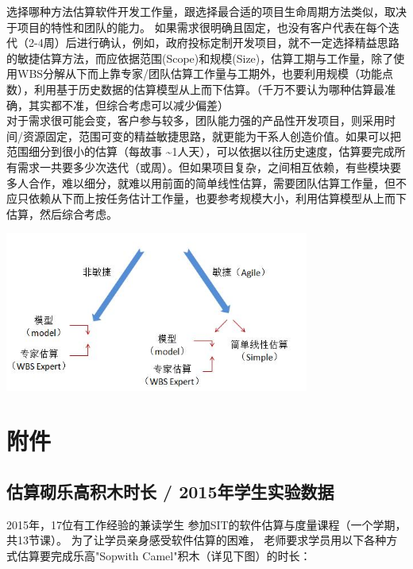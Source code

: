 选择哪种方法估算软件开发工作量，跟选择最合适的项目生命周期方法类似，取决于项目的特性和团队的能力。
如果需求很明确且固定，也没有客户代表在每个迭代（2-4周）后进行确认，例如，政府投标定制开发项目，就不一定选择精益思路的敏捷估算方法，而应依据范围(Scope)和规模(Size)，估算工期与工作量，除了使用WBS分解从下而上靠专家/团队估算工作量与工期外，也要利用规模（功能点数），利用基于历史数据的估算模型从上而下估算。（千万不要认为哪种估算最准确，其实都不准，但综合考虑可以减少偏差）\\
对于需求很可能会变，客户参与较多，团队能力强的产品性开发项目，则采用时间/资源固定，范围可变的精益敏捷思路，就更能为干系人创造价值。如果可以把范围细分到很小的估算（每故事
\textasciitilde{}1人天），可以依据以往历史速度，估算要完成所有需求一共要多少次迭代（或周）。但如果项目复杂，之间相互依赖，有些模块要多人合作，难以细分，就难以用前面的简单线性估算，需要团队估算工作量，但不应只依赖从下而上按任务估计工作量，也要参考规模大小，利用估算模型从上而下估算，然后综合考虑。


\includegraphics[width=10cm]{敏捷非敏捷1.jpg}

\hypertarget{ux9644ux4ef6}{%
\section{附件}\label{ux9644ux4ef6}}

\hypertarget{ux4f30ux7b97ux780cux4e50ux9ad8ux79efux6728ux65f6ux957f---2015ux5e74ux5b66ux751fux5b9eux9a8cux6570ux636e}{%
\subsection{估算砌乐高积木时长 /
2015年学生实验数据}\label{ux4f30ux7b97ux780cux4e50ux9ad8ux79efux6728ux65f6ux957f---2015ux5e74ux5b66ux751fux5b9eux9a8cux6570ux636e}}

2015年，17位有工作经验的兼读学生
参加SIT的软件估算与度量课程（一个学期，共13节课）。
为了让学员亲身感受软件估算的困难，
老师要求学员用以下各种方式估算要完成乐高"Sopwith
Camel"积木（详见下图）的时长：

